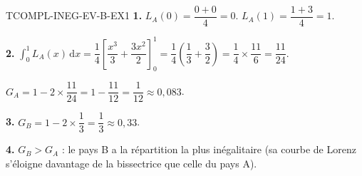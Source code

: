 \begin{corrige}{TCOMPL-INEG-EV-B-EX1}
\textbf{1.} $L_A(0)=\dfrac{0+0}{4}=0$. $L_A(1)=\dfrac{1+3}{4}=1$.

\textbf{2.} $\displaystyle\int_0^1 L_A(x)\,\mathrm{d}x = \dfrac{1}{4}\left[\dfrac{x^3}{3}+\dfrac{3x^2}{2}\right]_0^1 = \dfrac{1}{4}\left(\dfrac{1}{3}+\dfrac{3}{2}\right) = \dfrac{1}{4}\times\dfrac{11}{6} = \dfrac{11}{24}$.

$G_A = 1-2\times\dfrac{11}{24} = 1-\dfrac{11}{12} = \dfrac{1}{12} \approx 0{,}083$.

\textbf{3.} $G_B = 1-2\times\dfrac{1}{3} = \dfrac{1}{3} \approx 0{,}33$.

\textbf{4.} $G_B > G_A$ : le pays B a la répartition la plus inégalitaire (sa courbe de Lorenz s'éloigne davantage de la bissectrice que celle du pays A).
\end{corrige}
